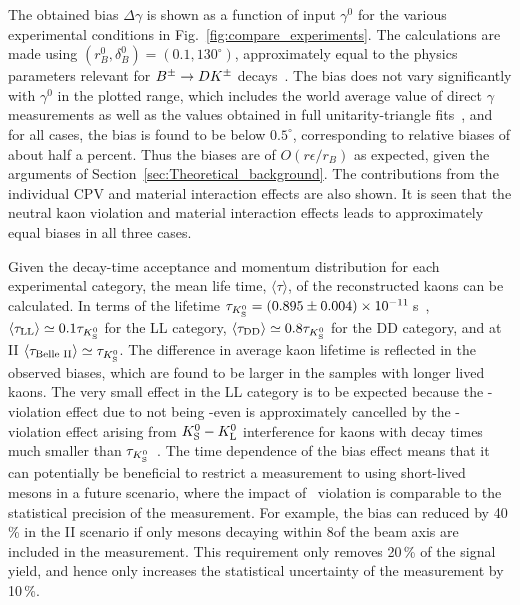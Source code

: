 The obtained bias $\Delta\gamma$ is shown as a function of input $\gamma^0$ for the various experimental conditions in Fig.~\ref{fig:compare_experiments}. The calculations are made using $(r_B^0, \delta_B^0)=(0.1, 130^\circ)$, approximately equal to the physics parameters relevant for ${{B}^\pm}\rightarrow{\ensuremath{D}}{\ensuremath{{K}^\pm}}$ decays~\cite{HFLAV16,UTfit-UT}.  The bias does not vary significantly with $\gamma^0$ in the plotted range, which includes the world average value of direct $\gamma$ measurements as well as the values obtained in full unitarity-triangle fits~\cite{HFLAV16,UTfit-UT,CKMfitter2015}, and for all cases, the bias is found to be below $0.5^\circ$, corresponding to relative biases of about half a percent. Thus the biases are of $O(r\epsilon /r_B)$ as expected, given the arguments of Section~\ref{sec:Theoretical_background}. The contributions from the individual \KS CPV and material interaction effects are also shown. It is seen that the neutral kaon \CP violation and material interaction effects leads to approximately equal biases in all three cases. 

Given the decay-time acceptance and momentum distribution for each experimental category, the mean life time, $\langle\tau\rangle$, of the reconstructed kaons can be calculated. In terms of the \KS lifetime ${\tau_{{K}^0_{\mathrm{S}}}=(0.895\pm0.004)\times10^{-11}\,}$s~\cite{PDG2018}, $\langle\tau_\text{LL}\rangle\simeq0.1\tau_{{K}^0_{\mathrm{S}}}$ for the \lhcb LL category, $\langle\tau_\text{DD}\rangle\simeq0.8\tau_{{K}^0_{\mathrm{S}}}$ for the \lhcb DD category, and at \belle II $\langle\tau_\text{Belle II}\rangle\simeq\tau_{{K}^0_{\mathrm{S}}}$. The difference in average kaon lifetime is reflected in the observed biases, which are found to be larger in the samples with longer lived kaons. The very small effect in the LL category is to be expected because the \CP-violation effect due to \KS not being \CP-even is approximately cancelled by the \CP-violation effect arising from ${{K}^0_{\mathrm{S}}}-{{K}^0_{\mathrm{L}}}$ interference for kaons with decay times much smaller than $\tau_{{K}^0_{\mathrm{S}}}$~\cite{Grossman2012}. The time dependence of the bias effect means that it can potentially be beneficial to restrict a measurement to using short-lived \KS mesons in a future scenario, where the impact of \KS\ \CP violation is comparable to the statistical precision of the measurement. For example, the bias can reduced by 40\,\% in the \belle II scenario if only \KS mesons decaying within 8\cm of the beam axis are included in the measurement. This requirement only removes 20\,\% of the signal yield, and hence only increases the statistical uncertainty of the measurement by 10\,\%.

